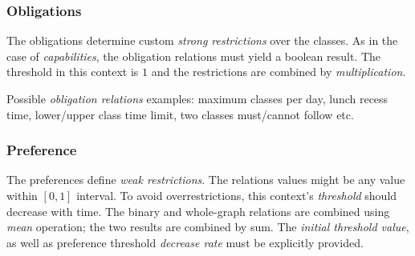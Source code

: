 \subsubsection{Obligations}

The obligations determine custom \emph{strong restrictions} over the classes.
As in the case of \emph{capabilities}, the obligation relations must yield a
boolean result. The threshold in this context is $1$ and the restrictions are
combined by \emph{multiplication}.


Possible \emph{obligation relations} examples: maximum classes per day,
lunch recess time, lower/upper class time limit, two classes must/cannot follow etc.


\subsubsection{Preference}

The preferences define \emph{weak restrictions}. The relations values might be any
value within $[0,1]$ interval. To avoid overrestrictions, this context's \emph{threshold}
should decrease with time. The binary and whole-graph relations are combined
using \emph{mean} operation; the two results are combined by sum. The
\emph{initial threshold value}, as well as preference threshold \emph{decrease rate}
must be explicitly provided.

